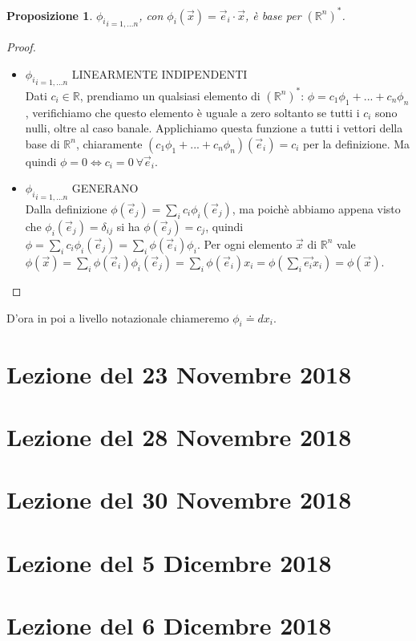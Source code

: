 \documentclass[10pt]{article}
\theoremstyle{plain}
\newtheorem{prop}[thm]{Proposizione}
\theoremstyle{definition}
\begin{document}
\begin{prop}
${\phi_i}_{i=1,...n}$, con $\phi_i(\vec{x})=\vec{e}_i\cdot \vec{x}$, è base per  $(\mathbb{R}^n)^*$.
\end{prop}
\begin{proof}
$\ $

\begin{itemize}
    \item ${\phi_i}_{i=1,...n}$ LINEARMENTE INDIPENDENTI \\ Dati $c_i \in \mathbb{R}$, prendiamo un qualsiasi elemento di $(\mathbb{R}^n)^*$: $\phi=c_1 \phi_1+...+c_n\phi_n$, verifichiamo che questo elemento è uguale a zero  soltanto se tutti i $c_i$ sono nulli, oltre al caso banale. Applichiamo questa funzione a tutti i vettori della base di $\mathbb{R}^n$, chiaramente $(c_1 \phi_1+...+c_n\phi_n)(\vec{e}_i)= c_i$ per la definizione. Ma quindi $\phi = 0 \Leftrightarrow c_i = 0\ \forall \vec{e}_i$. 
    \item ${\phi_i}_{i=1,...n}$ GENERANO \\ Dalla definizione $\phi(\vec{e}_j) = \sum_i c_i \phi_i(\vec{e}_j)$, ma poichè abbiamo appena visto che $\phi_i(\vec{e}_j)=\delta_{ij}$ si ha $\phi(\vec{e}_j) = c_j$, quindi $\phi = \sum_i c_i \phi_i(\vec{e}_j)=\sum_i \phi(\vec{e}_i) \phi_i$. Per ogni elemento $\vec{x}$ di $\mathbb{R}^n$ vale $\phi(\vec{x})=\sum_i \phi(\vec{e}_i) \phi_i(\vec{e}_j)=\sum_i \phi(\vec{e}_i) x_i=\phi(\sum_i \vec{e_i} x_i) =\phi(\vec{x})$.
\end{itemize}
\end{proof}
D'ora in poi a livello notazionale chiameremo $\phi_i\doteq dx_i$.

\section{Lezione del 23 Novembre 2018}
\section{Lezione del 28 Novembre 2018}
\section{Lezione del 30 Novembre 2018}
\section{Lezione del 5 Dicembre 2018}
\section{Lezione del 6 Dicembre 2018}
\end{document}
